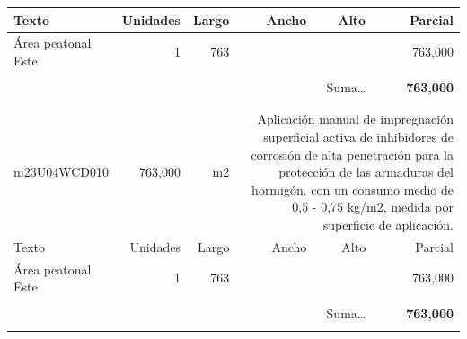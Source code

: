 \documentclass{book}%
\begin{document}
\begin{longtable}{lrrrrr}
Texto&Unidades&Largo&Ancho&Alto&Parcial\\%
\hline%
\multicolumn{1}{p{3.5cm}}{Área peatonal Este}&1&763&&&   763,000\\%
&&&&&\\%
\multicolumn{5}{r}{Suma\ldots}&\textbf{   763,000}\\%
\hline%
&&&&&\\%
&&&&&\\%
m23U04WCD010&   763,000& m2&\multicolumn{3}{p{6cm}}{\scriptsize Aplicación manual de impregnación superficial activa de inhibidores de corrosión de alta penetración para la protección de las armaduras del hormigón. con un consumo medio de 0,5 - 0,75 kg/m2, medida por superficie de aplicación.\normalsize}\\%
Texto&Unidades&Largo&Ancho&Alto&Parcial\\%
\hline%
\multicolumn{1}{p{3.5cm}}{Área peatonal Este}&1&763&&&   763,000\\%
&&&&&\\%
\multicolumn{5}{r}{Suma\ldots}&\textbf{   763,000}\\%
\hline%
&&&&&\\%
\end{longtable}%
\newpage

%
\end{document}
